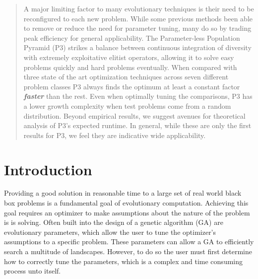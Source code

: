 \documentclass{sig-alternate}
\begin{document}
\maketitle
\begin{abstract}
A major limiting factor to many evolutionary techniques is their need to be reconfigured
to each new problem.  While some previous methods been able to remove or reduce
the need for parameter tuning, many do so by trading peak efficiency for general applicability.
The Parameter-less Population Pyramid (P3) strikes a balance between continuous integration
of diversity with extremely exploitative elitist operators, allowing it to solve easy
problems quickly and hard problems eventually.  When compared with three state of the art
optimization techniques across seven different problem classes P3 always finds the optimum
at least a constant factor \emph{\textbf{faster}} than the rest.  Even when optimally
tuning the comparisons, P3 has a lower growth complexity when test problems come
from a random distribution.  
Beyond empirical results, we suggest avenues for theoretical analysis of P3's
expected runtime.  In general, while these are only the first results for P3,
we feel they are indicative wide applicability.
\end{abstract}




\section{Introduction}
Providing a good solution in reasonable time to a large set of real world black box problems
is a fundamental goal of evolutionary computation.  Achieving this goal requires an
optimizer to make assumptions about the nature of the problem is is solving.
Often built into the design of a genetic algorithm (GA) are evolutionary parameters,
which allow the user to tune the optimizer's assumptions to a specific problem.  These
parameters can allow a GA to efficiently search a multitude of landscapes.  However,
to do so the user must first determine how to correctly tune the parameters, which is
a complex and time consuming process unto itself.
\end{document}
